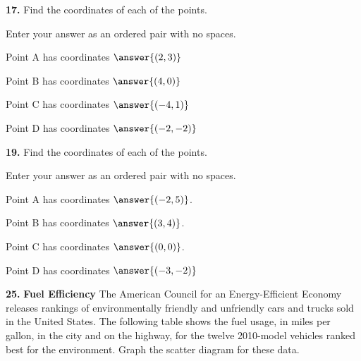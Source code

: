 \documentclass{ximera}
\begin{document}
\begin{problem}
\textbf{17.} Find the coordinates of each of the points.

Enter your answer as an ordered pair with no spaces.

 Point A has coordinates $ \answer{(2,3)} $ 

 Point B has coordinates $ \answer{(4,0)} $ 

 Point C has coordinates $ \answer{(-4,1)} $ 

 Point D has coordinates $ \answer{(-2,-2)} $
\end{problem}

\begin{problem}
\textbf{19.} Find the coordinates of each of the points.

Enter your answer as an ordered pair with no spaces.

Point A has coordinates $\answer{(-2,5)}$.

Point B has coordinates $\answer{(3,4)}$.

Point C has coordinates $\answer{(0,0)}$.

Point D has coordinates $\answer{(-3,-2)}$
\end{problem}

\begin{problem}
\textbf{25.} \textbf{Fuel Efficiency} The American Council for an Energy-Efficient Economy
  releases rankings of environmentally friendly and unfriendly cars and trucks sold in the
  United States. The following table shows the fuel usage, in miles per gallon, in the city
  and on the highway, for the twelve 2010-model vehicles ranked best for the environment.
  Graph the scatter diagram for these data.
\end{problem}
\end{document}
